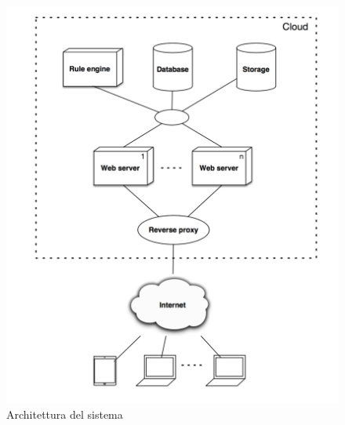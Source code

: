 \begin{figure}[H]
	\begin{center}
		\includegraphics[width=12cm]{Pics/architettura.png}
		\caption{Architettura del sistema}
		\label{fig:Architettura}
	\end{center}
\end{figure}


